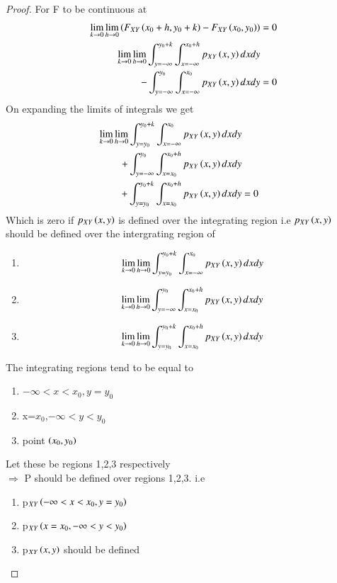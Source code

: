 \documentclass[journal,12pt,twocolumn]{IEEEtran}
\begin{document}
\begin{proof}
For F to be continuous at 
\begin{align}
\lim_{k\rightarrow 0}\lim_{h\rightarrow 0} \left(F_{XY}\left(x_0+h,y_0+k\right) - F_{XY}\left(x_0,y_0\right)\right)&=0\\
\lim_{k\rightarrow 0}\lim_{h\rightarrow 0}\int_{y=-\infty}^{y_0+k} \int_{x=-\infty}^{x_0+h} p_{XY}\left(x,y\right)dxdy \nonumber\\
-\int_{y=-\infty}^{y_0} \int_{x=-\infty}^{x_0} p_{XY}\left(x,y\right)dxdy&=0 
\end{align}
On expanding the limits of integrals we get
\begin{align}
\lim_{k\rightarrow 0}\lim_{h\rightarrow 0} \int_{y=y_0}^{y_0+k} \int_{x=-\infty}^{x_0} p_{XY}\left(x,y\right)dxdy \nonumber \\
+\int_{y=-\infty}^{y_0} \int_{x=x_0}^{x_0+h} p_{XY}\left(x,y\right)dxdy \nonumber \\
+\int_{y=y_0}^{y_0+k} \int_{x=x_0}^{x_0+h} p_{XY}\left(x,y\right)dxdy&=0
\end{align}
Which is zero if $p_{XY}\left(x,y\right)$ is defined over the integrating region i.e $p_{XY}\left(x,y\right)$ should be defined over the intergrating region of 
\begin{enumerate}
\item \[\lim_{k\rightarrow 0}\lim_{h\rightarrow 0} \int_{y=y_0}^{y_0+k} \int_{x=-\infty}^{x_0} p_{XY}\left(x,y\right)dxdy\]
\item \[\lim_{k\rightarrow 0}\lim_{h\rightarrow 0} \int_{y=-\infty}^{y_0} \int_{x=x_0}^{x_0+h} p_{XY}\left(x,y\right)dxdy\]
\item \[\lim_{k\rightarrow 0}\lim_{h\rightarrow 0} \int_{y=y_0}^{y_0+k} \int_{x=x_0}^{x_0+h} p_{XY}\left(x,y\right)dxdy\]
\end{enumerate}
The integrating regions tend to be equal to 
\begin{enumerate}
\item $-\infty<x<x_0,y=y_0$  
\item x=$x_0$,$-\infty<y<y_0$ 
\item point $\left(x_0,y_0\right)$ 
\end{enumerate}
Let these be regions 1,2,3 respectively\\
$\Rightarrow$ P should be defined over regions 1,2,3. i.e
\begin{enumerate}
\item p$_{XY}\left(-\infty<x<x_0,y=y_0\right)$  
\item p$_{XY}\left(x=x_0,-\infty<y<y_0\right)$ 
\item p$_{XY}\left(x,y\right) $ should be defined
\end{enumerate}
\end{proof}
\end{document}
